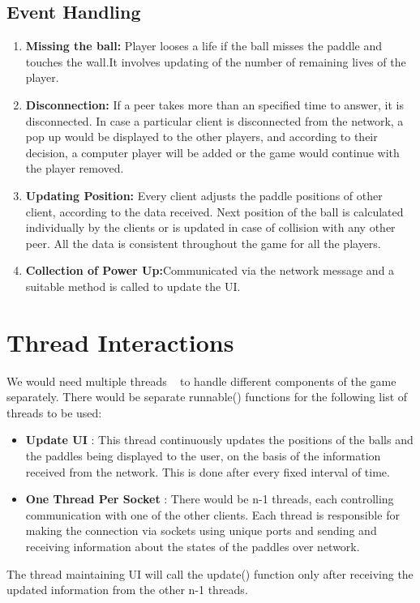 \documentclass{article}
\begin{document}
			\subsection{Event Handling}
			\begin{enumerate}
			\item \textbf{Missing the ball:} Player looses a life if the ball misses the paddle and touches the wall.It involves updating of the number of remaining lives of the player.
			\item \textbf{Disconnection: }If a peer takes more than an specified time to answer, it is disconnected. In case a particular client is disconnected from the network, a pop up would be displayed to the other players, and according to their decision, a computer player will be added or the game would continue with the player removed.
			\item \textbf{Updating Position: }Every client adjusts the paddle positions of other client, according to the data received. Next position of the ball is calculated individually by the clients or is updated in case of collision with any other peer. All the data is consistent throughout the game for all the players.
			\item \textbf{Collection of Power Up:}Communicated via the network message and a suitable method is called to update the UI.
			\end{enumerate}
			

	\section{Thread Interactions}
	\par\noindent We would need multiple threads ~\cite{thread_java} to handle different components of the game separately. There would be separate runnable() functions for the following list of threads to be used:
	\begin{itemize}
	\item \textbf{Update UI} : This thread continuously updates the positions of the balls and the paddles being displayed to the user, on the basis of the information received from the network. This is done after every fixed interval of time.
	\item \textbf{One Thread Per Socket} : There would be n-1 threads, each controlling communication with one of the other clients. Each thread is responsible for making the connection via sockets using unique ports and sending and receiving information about the states of the paddles over network.
	\end{itemize}
	\par\noindent The thread maintaining UI will call the update() function only after receiving the updated information from the other n-1 threads.
\end{document}
